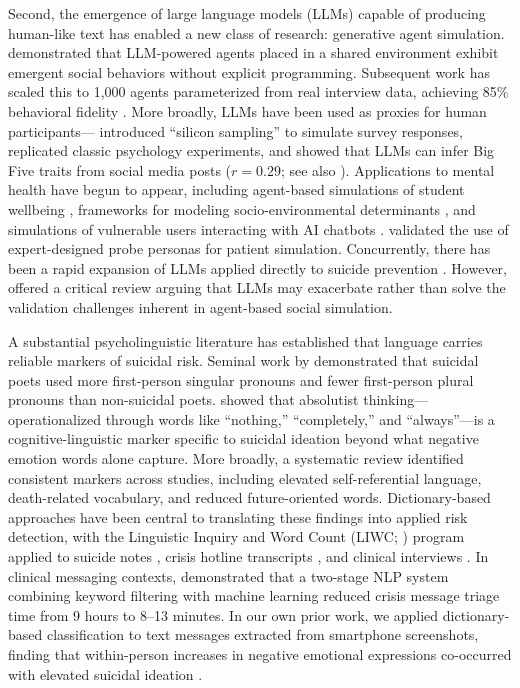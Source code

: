 \documentclass[review,12pt,authoryear]{elsarticle}
\begin{document}
Second, the emergence of large language models (LLMs) capable of producing human-like text has enabled a new class of research: generative agent simulation. \citet{park2023generative} demonstrated that LLM-powered agents placed in a shared environment exhibit emergent social behaviors without explicit programming. Subsequent work has scaled this to 1,000 agents parameterized from real interview data, achieving 85\% behavioral fidelity \citep{park2024generative}. More broadly, LLMs have been used as proxies for human participants---\citet{argyle2023silicon} introduced ``silicon sampling'' to simulate survey responses, \citet{aher2023turing} replicated classic psychology experiments, and \citet{peters2024llm} showed that LLMs can infer Big Five traits from social media posts ($r = 0.29$; see also \citealt{brickman2025llm}). Applications to mental health have begun to appear, including agent-based simulations of student wellbeing \citep{zhao2025studentlife}, frameworks for modeling socio-environmental determinants \citep{kambeitz2025modelling}, and simulations of vulnerable users interacting with AI chatbots \citep{qiu2025emoagent}. \citet{louie2024roleplay} validated the use of expert-designed probe personas for patient simulation. Concurrently, there has been a rapid expansion of LLMs applied directly to suicide prevention \citep{holmes2025scoping}. However, \citet{tornberg2025validation} offered a critical review arguing that LLMs may exacerbate rather than solve the validation challenges inherent in agent-based social simulation.

A substantial psycholinguistic literature has established that language carries reliable markers of suicidal risk. Seminal work by \citet{stirman2001word} demonstrated that suicidal poets used more first-person singular pronouns and fewer first-person plural pronouns than non-suicidal poets. \citet{almosaiwi2018absolute} showed that absolutist thinking---operationalized through words like ``nothing,'' ``completely,'' and ``always''---is a cognitive-linguistic marker specific to suicidal ideation beyond what negative emotion words alone capture. More broadly, a systematic review \citep{ophir2022linguistic} identified consistent markers across studies, including elevated self-referential language, death-related vocabulary, and reduced future-oriented words. Dictionary-based approaches have been central to translating these findings into applied risk detection, with the Linguistic Inquiry and Word Count (LIWC; \citealt{pennebaker2015development}) program applied to suicide notes \citep{pestian2012sentiment}, crisis hotline transcripts \citep{huang2024mindsets}, and clinical interviews \citep{tausczik2010psychological}. In clinical messaging contexts, \citet{swaminathan2023nlp} demonstrated that a two-stage NLP system combining keyword filtering with machine learning reduced crisis message triage time from 9 hours to 8--13 minutes. In our own prior work, we applied dictionary-based classification to text messages extracted from smartphone screenshots, finding that within-person increases in negative emotional expressions co-occurred with elevated suicidal ideation \citep{ammerman2026beyond}.
\end{document}

